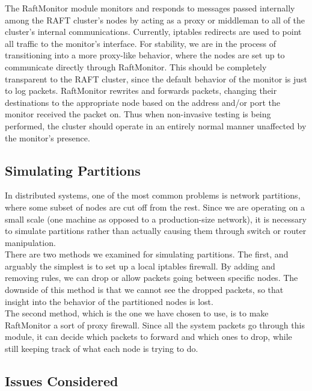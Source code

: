 \documentclass[UTF8]{article}
\begin{document}
The RaftMonitor module monitors and responds to messages passed internally among the RAFT cluster's nodes by acting as a proxy or middleman to all of the cluster's internal communications. Currently, iptables redirects are used to point all traffic to the monitor's interface. For stability, we are in the process of transitioning into a more proxy-like behavior, where the nodes are set up to communicate directly through RaftMonitor. This should be completely transparent to the RAFT cluster, since the default behavior of the monitor is just to log packets. RaftMonitor rewrites and forwards packets, changing their destinations to the appropriate node based on the address and/or port the monitor received the packet on. Thus when non-invasive testing is being performed, the cluster should operate in an entirely normal manner unaffected by the monitor's presence.

\subsection{Simulating Partitions}

In distributed systems, one of the most common problems is network partitions, where some subset of nodes are cut off from the rest. Since we are operating on a small scale (one machine as opposed to a production-size network), it is necessary to simulate partitions rather than actually causing them through switch or router manipulation.
\\ \indent There are two methods we examined for simulating partitions. The first, and arguably the simplest is to set up a local iptables firewall. By adding and removing rules, we can drop or allow packets going between specific nodes. The downside of this method is that we cannot see the dropped packets, so that insight into the behavior of the partitioned nodes is lost.
\\ \indent The second method, which is the one we have chosen to use, is to make RaftMonitor a sort of proxy firewall. Since all the system packets go through this module, it can decide which packets to forward and which ones to drop, while still keeping track of what each node is trying to do.

\subsection{Issues Considered}
\end{document}
